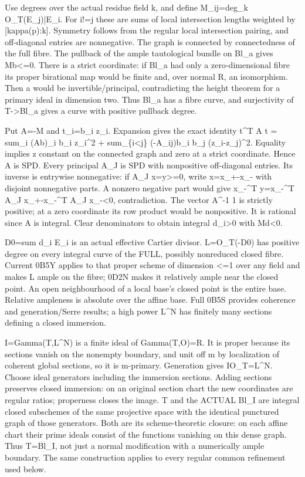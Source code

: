 \documentclass[11pt]{article}
\begin{document}
Use degrees over the actual residue field k, and define M\_ij=deg\_k O\_T(E\_j)|E\_i. For i!=j these are sums of local intersection lengths weighted by [kappa(p):k]. Symmetry follows from the regular local intersection pairing, and off-diagonal entries are nonnegative. The graph is connected by connectedness of the full fibre. The pullback of the ample tautological bundle on Bl\_a gives Mb<=0. There is a strict coordinate: if Bl\_a had only a zero-dimensional fibre its proper birational map would be finite and, over normal R, an isomorphism. Then a would be invertible/principal, contradicting the height theorem for a primary ideal in dimension two. Thus Bl\_a has a fibre curve, and surjectivity of T->Bl\_a gives a curve with positive pullback degree.

Put A=-M and t\_i=b\_i z\_i. Expansion gives the exact identity
 t\textasciicircum{}T A t = sum\_i (Ab)\_i b\_i z\_i\textasciicircum{}2 + sum\_\{i<j\} (-A\_ij)b\_i b\_j (z\_i-z\_j)\textasciicircum{}2.
Equality implies z constant on the connected graph and zero at a strict coordinate. Hence A is SPD. Every principal A\_J is SPD with nonpositive off-diagonal entries. Its inverse is entrywise nonnegative: if A\_J x=y>=0, write x=x\_+-x\_- with disjoint nonnegative parts. A nonzero negative part would give x\_-\textasciicircum{}T y=x\_-\textasciicircum{}T A\_J x\_+-x\_-\textasciicircum{}T A\_J x\_-<0, contradiction. The vector A\textasciicircum{}-1 1 is strictly positive; at a zero coordinate its row product would be nonpositive. It is rational since A is integral. Clear denominators to obtain integral d\_i>0 with Md<0.

D0=sum d\_i E\_i is an actual effective Cartier divisor. L=O\_T(-D0) has positive degree on every integral curve of the FULL, possibly nonreduced closed fibre. Current 0B5Y applies to that proper scheme of dimension <=1 over any field and makes L ample on the fibre; 0D2N makes it relatively ample near the closed point. An open neighbourhood of a local base's closed point is the entire base. Relative ampleness is absolute over the affine base. Full 0B5S provides coherence and generation/Serre results; a high power L\textasciicircum{}N has finitely many sections defining a closed immersion.

I=Gamma(T,L\textasciicircum{}N) is a finite ideal of Gamma(T,O)=R. It is proper because its sections vanish on the nonempty boundary, and unit off m by localization of coherent global sections, so it is m-primary. Generation gives IO\_T=L\textasciicircum{}N. Choose ideal generators including the immersion sections. Adding sections preserves closed immersion: on an original section chart the new coordinates are regular ratios; properness closes the image. T and the ACTUAL Bl\_I are integral closed subschemes of the same projective space with the identical punctured graph of those generators. Both are its scheme-theoretic closure: on each affine chart their prime ideals consist of the functions vanishing on this dense graph. Thus T=Bl\_I, not just a normal modification with a numerically ample boundary. The same construction applies to every regular common refinement used below.
\end{document}
